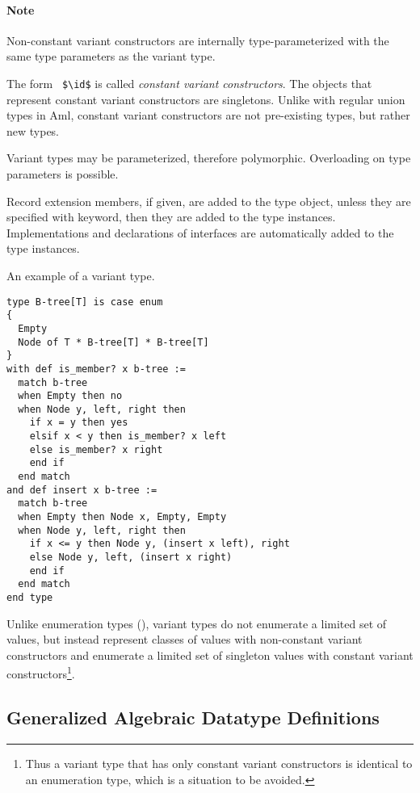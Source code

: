\paragraph{Note}
Non-constant variant constructors are internally type-parameterized with the same type parameters as the variant type. 

The form ~\lstinline!$\id$! is called {\em constant variant constructors}. The objects that represent constant variant constructors are singletons. Unlike with regular union types in Aml, constant variant constructors are not pre-existing types, but rather new types. 

Variant types may be parameterized, therefore polymorphic. Overloading on type parameters is possible. 

Record extension members, if given, are added to the type object, unless they are specified with  keyword, then they are added to the type instances. Implementations and declarations of interfaces are automatically added to the type instances. 

\example An example of a variant type. 
\begin{lstlisting}
type B-tree[T] is case enum 
{
  Empty
  Node of T * B-tree[T] * B-tree[T]
}
with def is_member? x b-tree :=
  match b-tree
  when Empty then no
  when Node y, left, right then
    if x = y then yes
    elsif x < y then is_member? x left
    else is_member? x right
    end if
  end match
and def insert x b-tree := 
  match b-tree
  when Empty then Node x, Empty, Empty
  when Node y, left, right then
    if x <= y then Node y, (insert x left), right
    else Node y, left, (insert x right)
    end if
  end match
end type
\end{lstlisting}

Unlike enumeration types (), variant types do not enumerate a limited set of values, but instead represent classes of values with non-constant variant constructors and enumerate a limited set of singleton values with constant variant constructors\footnote{Thus a variant type that has only constant variant constructors is identical to an enumeration type, which is a situation to be avoided.}. 





\subsection{Generalized Algebraic Datatype Definitions}
\label{sec:gadt-types}

